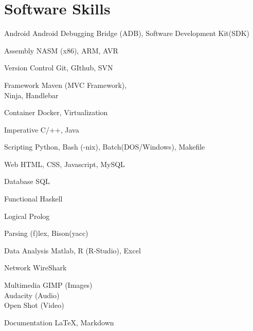 \documentclass{tccv}
\begin{document}
\section{Software Skills}
	\begin{factlist}
		\item {Android}
			{Android Debugging Bridge (ADB),
			Software Development Kit(SDK)}
		\item {Assembly}
			{NASM (x86), ARM, AVR}
		\item {Version Control}
			{Git, GIthub, SVN}
		\item{Framework}
			{Maven (MVC Framework), \\
			 Ninja, Handlebar}
		\item{Container}
			{Docker,
			Virtualization}
		\item{Imperative}
			{C/++, Java}
		\item{Scripting}
			{Python,
			 Bash (-nix),
			 Batch(DOS/Windows), 
			 Makefile}
		\item{Web}
			{HTML, CSS, Javascript, MySQL}
		\item{Database}
			{SQL}
		\item{Functional}
			{Haskell}
		\item{Logical}
			{Prolog}
		\item{Parsing}
			{(f)lex, Bison(yacc)}
		\item{Data Analysis}
			{Matlab, R (R-Studio), Excel}
		\item{Network}
			{WireShark}
		\item{Multimedia}
			{GIMP (Images) \\
			Audacity (Audio)\\
			Open Shot (Video)} 
		\item{Documentation}
			{\LaTeX, Markdown}
	\end{factlist}




\end{document}
